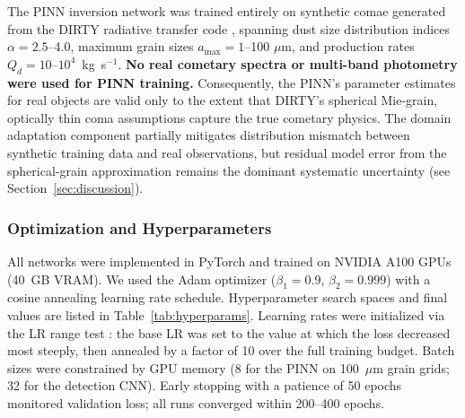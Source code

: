 \documentclass[preprint2]{aastex631}
\begin{document}
The PINN inversion network was trained entirely on synthetic comae generated from the DIRTY radiative transfer code \citep{gordon01}, spanning dust size distribution indices $\alpha = 2.5$--4.0, maximum grain sizes $a_{\max} = 1$--100 $\mu$m, and production rates $Q_d = 10$--$10^4$~kg~s$^{-1}$. \textbf{No real cometary spectra or multi-band photometry were used for PINN training.} Consequently, the PINN's parameter estimates for real objects are valid only to the extent that DIRTY's spherical Mie-grain, optically thin coma assumptions capture the true cometary physics. The domain adaptation component partially mitigates distribution mismatch between synthetic training data and real observations, but residual model error from the spherical-grain approximation remains the dominant systematic uncertainty (see Section~\ref{sec:discussion}).

\subsubsection{Optimization and Hyperparameters}

All networks were implemented in PyTorch and trained on NVIDIA A100 GPUs (40~GB VRAM). We used the Adam optimizer ($\beta_1 = 0.9$, $\beta_2 = 0.999$) with a cosine annealing learning rate schedule. Hyperparameter search spaces and final values are listed in Table~\ref{tab:hyperparams}. Learning rates were initialized via the LR range test \citep{smith17}: the base LR was set to the value at which the loss decreased most steeply, then annealed by a factor of 10 over the full training budget. Batch sizes were constrained by GPU memory (8 for the PINN on 100~$\mu$m grain grids; 32 for the detection CNN). Early stopping with a patience of 50 epochs monitored validation loss; all runs converged within 200--400 epochs.
\end{document}
